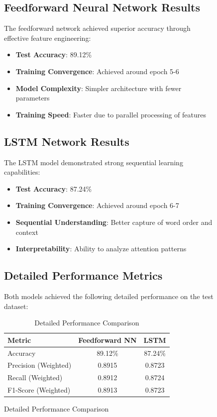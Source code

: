 \documentclass[a4paper, journal]{IEEEtran}
\begin{document}
\begin{figure}[!t]
\subsection{Feedforward Neural Network Results}

The feedforward network achieved superior accuracy through effective feature engineering:

\begin{itemize}
    \item \textbf{Test Accuracy}: 89.12\%
    \item \textbf{Training Convergence}: Achieved around epoch 5-6
    \item \textbf{Model Complexity}: Simpler architecture with fewer parameters
    \item \textbf{Training Speed}: Faster due to parallel processing of features
\end{itemize}

\subsection{LSTM Network Results}

The LSTM model demonstrated strong sequential learning capabilities:

\begin{itemize}
    \item \textbf{Test Accuracy}: 87.24\%
    \item \textbf{Training Convergence}: Achieved around epoch 6-7
    \item \textbf{Sequential Understanding}: Better capture of word order and context
    \item \textbf{Interpretability}: Ability to analyze attention patterns
\end{itemize}

\subsection{Detailed Performance Metrics}

Both models achieved the following detailed performance on the test dataset:

\begin{table}[ht]
\centering
\begin{tabular}{@{}lcc@{}}
\toprule
\textbf{Metric} & \textbf{Feedforward NN} & \textbf{LSTM} \\
\midrule
Accuracy & 89.12\% & 87.24\% \\
Precision (Weighted) & 0.8915 & 0.8723 \\
Recall (Weighted) & 0.8912 & 0.8724 \\
F1-Score (Weighted) & 0.8913 & 0.8723 \\
\bottomrule
\end{tabular}
\caption{Detailed Performance Comparison}
\label{tab:detailed_performance}
\end{table}


\end{figure}
\end{document}
